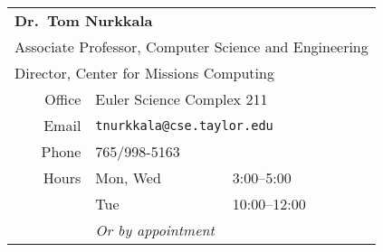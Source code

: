 \begin{center}
  \begin{tabular}{rll}
    \toprule
    \multicolumn{3}{l}{\textbf{Dr.\ Tom Nurkkala}}                            \\
    \multicolumn{3}{l}{Associate Professor, Computer Science and Engineering} \\
    \multicolumn{3}{l}{Director, Center for Missions Computing}               \\
    \midrule
    Office & \multicolumn{2}{l}{Euler Science Complex 211}                    \\
    Email  & \multicolumn{2}{l}{\texttt{tnurkkala@cse.taylor.edu}}            \\
    Phone  & \multicolumn{2}{l}{765/998-5163}                                 \\
    Hours  & Mon, Wed & 3:00--5:00                                            \\
           & Tue      & 10:00--12:00                                          \\
           & \multicolumn{2}{l}{\emph{Or by appointment}}                     \\
    \bottomrule
  \end{tabular}
\end{center}


